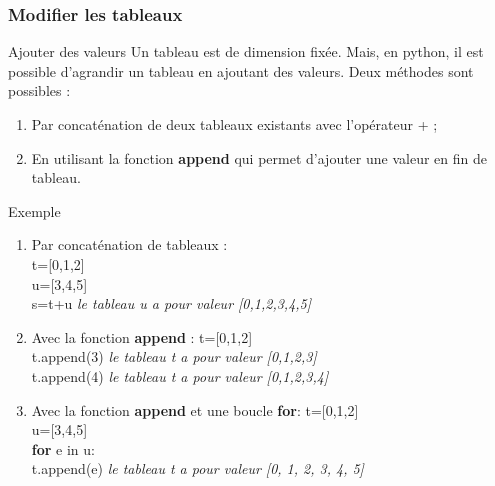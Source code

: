 \documentclass[9pt]{beamer}
\newcounter{num}
\begin{document}
\begin{frame}
\frametitle{Modifier les tableaux}

\begin{block}{Ajouter des valeurs}
Un tableau est de dimension fixée. Mais, en python, il est possible d'agrandir un tableau en ajoutant des valeurs. Deux méthodes sont possibles :
\begin{enumerate}
\item Par concaténation de deux tableaux existants avec l'opérateur + ;
\item En utilisant la fonction \textbf{append} qui permet d'ajouter une valeur en fin de tableau.
\end{enumerate}
\end{block}

\begin{exampleblock}{Exemple}
\begin{enumerate}
\item Par concaténation de tableaux :\\
t=[0,1,2]\\
u=[3,4,5]\\
s=t+u \hspace{1cm} \textit{le tableau u a pour valeur [0,1,2,3,4,5]}
\item Avec la fonction \textbf{append} :
t=[0,1,2]\\
t.append(3) \hspace{1cm} \textit{le tableau t a pour valeur [0,1,2,3]}\\
t.append(4) \hspace{1cm} \textit{le tableau t a pour valeur [0,1,2,3,4]}
\item Avec la fonction \textbf{append} et une boucle \textbf{for}:
t=[0,1,2]\\
u=[3,4,5]\\
\textbf{for} e in u:\\
\hspace{0.5cm}t.append(e) \hspace{1cm} \textit{le tableau t a pour valeur [0, 1, 2, 3, 4, 5]}
\end{enumerate}
\end{exampleblock}

\end{frame}
\end{document}

